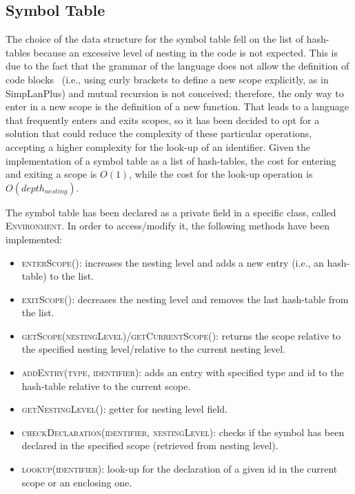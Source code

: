 \documentclass[11pt]{article} %
\begin{document}
\clearpage

\subsection{Symbol Table}
The choice of the data structure for the symbol table fell on the list of hash-tables because an excessive level of nesting in the code is not expected. This is due to the fact that the grammar of the language does not allow the definition of {code blocks}~\cite{codeblocks} (i.e., using curly brackets to define a new scope explicitly, as in SimpLanPlus) and mutual recursion is not conceived; therefore, the only way to enter in a new scope is the definition of a new function. That leads to a language that frequently enters and exits scopes, so it has been decided to opt for a solution that could reduce the complexity of these particular operations, accepting a higher complexity for the look-up of an identifier. Given the implementation of a symbol table as a list of hash-tables, the cost for entering and exiting a scope is \(O(1)\), while the cost for the look-up operation is \(O(depth_{nesting})\).

\medskip

The symbol table has been declared as a private field in a specific class, called \textsc{Environment}. In order to access/modify it, the following methods have been implemented:
\begin{itemize}
\item \textsc{enterScope()}: increases the nesting level and adds a new entry (i.e., an hash-table) to the list. 
\item \textsc{exitScope()}: decreases the nesting level and removes the last hash-table from the list.
\item \textsc{getScope(nestingLevel)}/\textsc{getCurrentScope()}: returns the scope relative to the specified nesting level/relative to the current nesting level.
\item \textsc{addEntry(type, identifier)}: adds an entry with specified type and id to the hash-table relative to the current scope.
\item \textsc{getNestingLevel()}: getter for nesting level field.
\item \textsc{checkDeclaration(identifier, nestingLevel)}: checks if the symbol has been declared in the specified scope (retrieved from nesting level). 
\item \textsc{lookup(identifier)}: look-up for the declaration of a given id in the current scope or an enclosing one. 
\end{itemize}
\end{document}
